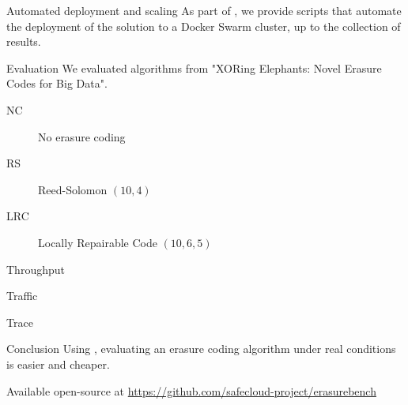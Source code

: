 \begin{frame}{Automated deployment and scaling}
    As part of \sys, we provide scripts that automate the deployment of the solution to a Docker Swarm cluster, up to the collection of results.
\end{frame}

\subtitle[Evaluation]{Evaluation}

\begin{frame}{Evaluation}
    We evaluated algorithms from "XORing Elephants: Novel Erasure Codes for Big Data".
    \begin{description}
        \item[NC] No erasure coding
        \item[RS] Reed-Solomon $(10,4)$
        \item[LRC] Locally Repairable Code $(10,6,5)$
    \end{description}
\end{frame}

\begin{frame}{Throughput}
    \begin{figure}
        
    \end{figure}
\end{frame}

\begin{frame}{Traffic}
    \begin{figure}
        
    \end{figure}
\end{frame}

\begin{frame}{Trace}
    \begin{figure}
        
    \end{figure}
\end{frame}

\subtitle[Conclusion]{Conclusion}

\begin{frame}{Conclusion}
    Using \sys, evaluating an erasure coding algorithm under real conditions is easier and cheaper.
    \vspace*{5mm}
    
    Available open-source at \url{https://github.com/safecloud-project/erasurebench}
\end{frame}




